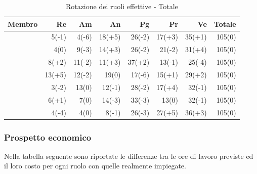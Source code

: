 \documentclass[12pt,a4paper]{article}
\begin{document}
\begin{table}[H]
	\begin{center}
		\begin{tabular}{l r r r r r r r}
\toprule
\textbf{Membro}	&	\textbf{Re}	&	\textbf{Am}	& \textbf{An} 	& \textbf{Pg} 	& \textbf{Pr} 	& \textbf{Ve} 	& \textbf{Totale}\\
\midrule
\midrule
\IB{} 			& 5(-1)			& 4(-6)			& 18(+5)		& 26(-2)		& 17(+3)		& 35(+1)		& 105(0) \\
\midrule
\AB{} 			& 4(0)			& 9(-3)			& 14(+3)		& 26(-2)		& 21(-2)		& 31(+4)		& 105(0) \\
\midrule
\NDC{} 			& 8(+2)			& 11(-2)		& 11(+3)		& 37(+2)		& 13(-1)		& 25(-4)		& 105(0) \\
\midrule
\TP{} 			& 13(+5)		& 12(-2)		& 19(0)			& 17(-6)		& 15(+1)		& 29(+2)		& 105(0) \\
\midrule
\WS{} 			& 3(-2)			& 13(0)			& 12(-1)		& 28(-2)		& 17(+4)		& 32(-1)		& 105(0) \\
\midrule
\AVE{} 			& 6(+1)			& 7(0)			& 14(-3)		& 33(-3)		& 13(0)			& 32(-1)		& 105(0) \\
\midrule
\AVI{} 			& 4(-4)			& 4(0)			& 8(-1)			& 26(-3)		& 27(+5)		& 36(+3)		& 105(0) \\
\bottomrule
		\end{tabular}
		\caption{Rotazione dei ruoli effettive - Totale}
	\end{center}
\end{table}

\subsubsection{Prospetto economico}
Nella tabella seguente sono riportate le differenze tra le ore di lavoro previste ed il loro costo per ogni ruolo con quelle realmente impiegate.
\end{document}
